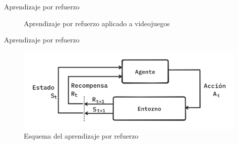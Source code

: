 \documentclass[aspectratio=169]{beamer}
\begin{document}
        \begin{frame}{Aprendizaje por refuerzo}
           \begin{figure}
                \centering
                \hspace{1cm}
                \caption{Aprendizaje por refuerzo aplicado a videojuegos}
            \end{figure}
        \end{frame}

        \begin{frame}{Aprendizaje por refuerzo}
            \begin{figure}
                \centering
                \includegraphics[height=0.5\textheight]{imgs/RL.png}
                \caption{Esquema del aprendizaje por refuerzo}
            \end{figure}
        \end{frame}
\end{document}
